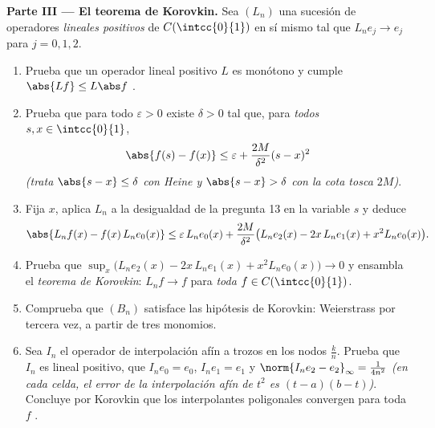 \begin{problem}
\medskip
\noindent\textbf{Parte III --- El teorema de Korovkin.} Sea $(L_n)$
una sucesión de operadores \emph{lineales positivos} de
$C(\intcc{0}{1})$ en sí mismo tal que $L_ne_j \to e_j$
 para $j = 0, 1, 2$.
\begin{enumerate}[resume]
  \item Prueba que un operador lineal positivo $L$ es monótono y
        cumple $\abs{Lf} \leq L\abs f$ .
  \item Prueba que para todo $\varepsilon > 0$ existe $\delta > 0$
        tal que, para \emph{todos} $s, x \in \intcc{0}{1}$,
        \[
        \abs{f(s) - f(x)} \leq \varepsilon +
        \frac{2M}{\delta^2}(s - x)^2
        \]
        \emph{(trata $\abs{s - x} \leq \delta$ con Heine y $\abs{s-x}
        > \delta$ con la cota tosca $2M$)}.
  \item Fija $x$, aplica $L_n$ a la desigualdad de la pregunta 13 en
        la variable $s$ y deduce
        \[
        \abs{L_nf(x) - f(x)\,L_ne_0(x)}
        \leq \varepsilon\,L_ne_0(x) + \frac{2M}{\delta^2}
        \bigl(L_ne_2(x) - 2x\,L_ne_1(x) + x^2 L_ne_0(x)\bigr).
        \]
  \item Prueba que $\sup_x \bigl(L_ne_2(x) - 2x\,L_ne_1(x) + x^2
        L_ne_0(x)\bigr) \to 0$ y ensambla el \emph{teorema de
        Korovkin}: $L_nf \to f$  para \emph{toda} $f
        \in C(\intcc{0}{1})$.
  \item Comprueba que $(B_n)$ satisface las hipótesis de Korovkin:
        Weierstrass por tercera vez, a partir de tres monomios.
  \item Sea $I_n$ el operador de interpolación afín a trozos en los
        nodos $\frac kn$. Prueba que $I_n$ es lineal positivo, que
        $I_ne_0 = e_0$, $I_ne_1 = e_1$ y $\norm{I_ne_2 -
        e_2}_\infty = \frac{1}{4n^2}$ \emph{(en cada celda, el error
        de la interpolación afín de $t^2$ es $(t - a)(b - t)$)}.
        Concluye por Korovkin que los interpolantes poligonales
        convergen  para toda $f$ .
\end{enumerate}


\end{problem}
